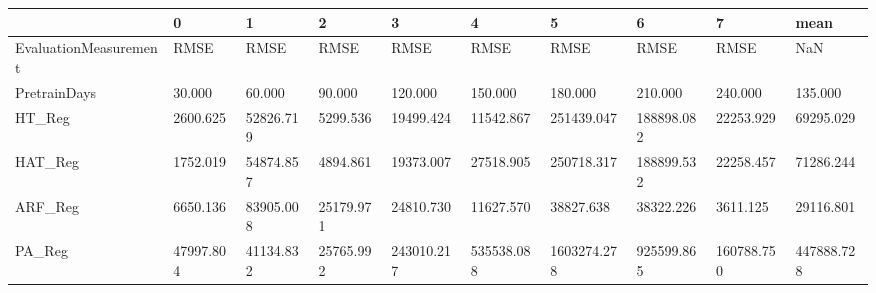 \begin{tabular}{llllllllll}
\toprule
{} &         0 &         1 &         2 &          3 &          4 &           5 &          6 &          7 &       mean \\
\midrule
EvaluationMeasurement &      RMSE &      RMSE &      RMSE &       RMSE &       RMSE &        RMSE &       RMSE &       RMSE &        NaN \\
PretrainDays          &    30.000 &    60.000 &    90.000 &    120.000 &    150.000 &     180.000 &    210.000 &    240.000 &    135.000 \\
HT\_Reg                &  2600.625 & 52826.719 &  5299.536 &  19499.424 &  11542.867 &  251439.047 & 188898.082 &  22253.929 &  69295.029 \\
HAT\_Reg               &  1752.019 & 54874.857 &  4894.861 &  19373.007 &  27518.905 &  250718.317 & 188899.532 &  22258.457 &  71286.244 \\
ARF\_Reg               &  6650.136 & 83905.008 & 25179.971 &  24810.730 &  11627.570 &   38827.638 &  38322.226 &   3611.125 &  29116.801 \\
PA\_Reg                & 47997.804 & 41134.832 & 25765.992 & 243010.217 & 535538.088 & 1603274.278 & 925599.865 & 160788.750 & 447888.728 \\
\bottomrule
\end{tabular}
